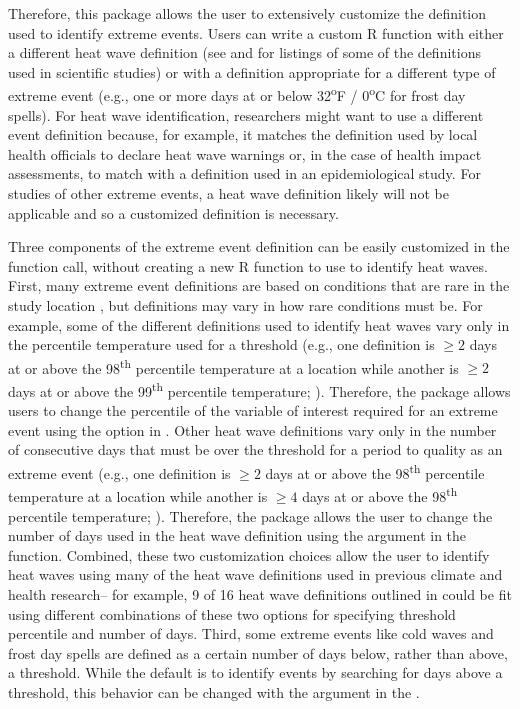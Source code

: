 Therefore, this package allows the user to extensively customize the
definition used to identify extreme events. Users can write a custom R
function with either a different heat wave definition (see
\citet{smith2013heat} and \citet{kent2014heat} for listings of some of
the definitions used in scientific studies) or with a definition
appropriate for a different type of extreme event (e.g., one or more
days at or below 32\textsuperscript{o}F / 0\textsuperscript{o}C for
frost day spells). For heat wave identification, researchers might want
to use a different event definition because, for example, it matches the
definition used by local health officials to declare heat wave warnings
or, in the case of health impact assessments, to match with a definition
used in an epidemiological study. For studies of other extreme events, a
heat wave definition likely will not be applicable and so a customized
definition is necessary.

Three components of the extreme event definition can be easily
customized in the  function call, without creating a
new R function to use to identify heat waves. First, many extreme event
definitions are based on conditions that are rare in the study location
\citep{IPCCch1}, but definitions may vary in how rare conditions must
be. For example, some of the different definitions used to identify heat
waves vary only in the percentile temperature used for a threshold
(e.g., one definition is \(\ge2\) days at or above the
98\textsuperscript{th} percentile temperature at a location while
another is \(\ge2\) days at or above the 99\textsuperscript{th}
percentile temperature; \citet{kent2014heat, smith2013heat}). Therefore,
the  package allows users to change the percentile
of the variable of interest required for an extreme event using the
 option in . Other heat wave
definitions vary only in the number of consecutive days that must be
over the threshold for a period to quality as an extreme event (e.g.,
one definition is \(\ge2\) days at or above the 98\textsuperscript{th}
percentile temperature at a location while another is \(\ge4\) days at
or above the 98\textsuperscript{th} percentile temperature;
\citet{anderson2009weather}). Therefore, the package allows the user to
change the number of days used in the heat wave definition using the
 argument in the  function. Combined,
these two customization choices allow the user to identify heat waves
using many of the heat wave definitions used in previous climate and
health research-- for example, 9 of 16 heat wave definitions outlined in
\citet{kent2014heat} could be fit using different combinations of these
two options for specifying threshold percentile and number of days.
Third, some extreme events like cold waves and frost day spells are
defined as a certain number of days below, rather than above, a
threshold. While the default is to identify events by searching for days
above a threshold, this behavior can be changed with the
 argument in the
.

